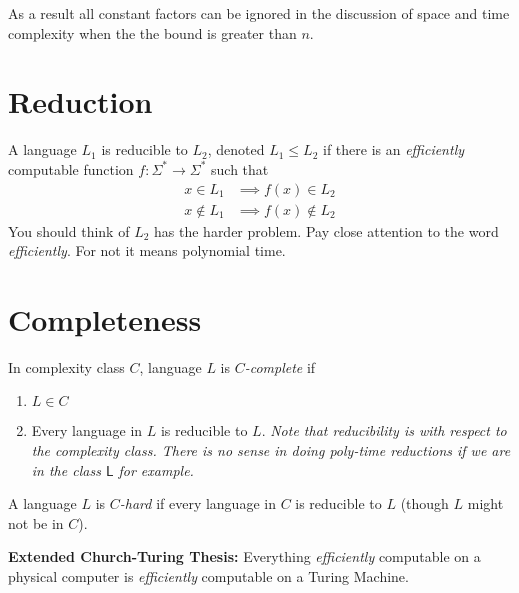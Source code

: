 \documentclass[twoside]{article}
\begin{document}
As a result all constant factors can be ignored in the discussion of space and time complexity when the the bound is greater than $n$.

\section{Reduction}
A language $L_1$ is reducible to $L_2$, denoted $L_1 \leq L_2$ if there is an \emph{efficiently} computable function $f: \Sigma^* \rightarrow \Sigma^*$ such that 
\begin{align*}
x \in L_1 &\implies f(x) \in L_2 \\
x \notin L_1 &\implies f(x) \notin L_2
\end{align*}
You should think of $L_2$ has the harder problem. Pay close attention to the word \emph{efficiently}. For not it means polynomial time.

\section{Completeness}
In complexity class $C$, language $L$ is \emph{$C$-complete} if
\begin{enumerate}
\item $L \in C$
\item Every language in $L$ is reducible to $L$. \emph{Note that reducibility is with respect to the complexity class. There is no sense in doing poly-time reductions if we are in the class $\mathsf{L}$ for example.} 
\end{enumerate}
A language $L$ is \emph{$C$-hard} if every language in $C$ is reducible to $L$ (though $L$ might not be in $C$). 

\textbf{Extended Church-Turing Thesis:} Everything \emph{efficiently} computable on a physical computer is \emph{efficiently} computable on a Turing Machine.

\begin{comment}
\section{Diagonalization}
Yeah, it is kind of weird to have a full chapter devoted to this, but it is an important tool for separating complexity classes. In essence one needs to exhibit a machine in one class that gives a different answer on some input from \emph{every} machine in another class. Use this tool to prove \emph{hierarchy theorems}.
\end{comment}
\end{document}
